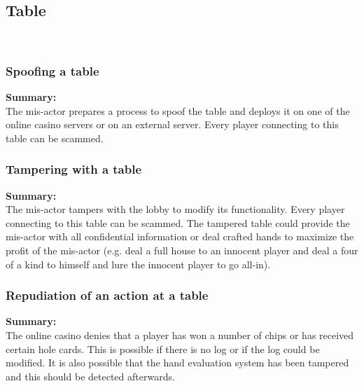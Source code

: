 \documentclass[a4paper,11pt]{report}
\begin{document}
\subsection{Table}\
\label{TableCases}
\subsubsection{Spoofing a table}
\label{TableCasesS}
\textbf{Summary:} \\
The mis-actor prepares a process to spoof the table and deploys it on one of the online casino servers or on an external server. Every player connecting to this table can be scammed.
\subsubsection{Tampering with a table}
\label{TableCasesT}
\textbf{Summary:} \\
The mis-actor tampers with the lobby to modify its functionality. Every player connecting to this table can be scammed. The tampered table could provide the mis-actor with all confidential information or deal crafted hands to maximize the profit of the mis-actor (e.g. deal a full house to an innocent player and deal a four of a kind to himself and lure the innocent player to go all-in).
\subsubsection{Repudiation of an action at a table}
\label{TableCasesR}
\textbf{Summary:} \\
The online casino denies that a player has won a number of chips or has received certain hole cards. This is possible if there is no log or if the log could be modified. It is also possible that the hand evaluation system has been tampered and this should be detected afterwards.
\end{document}
